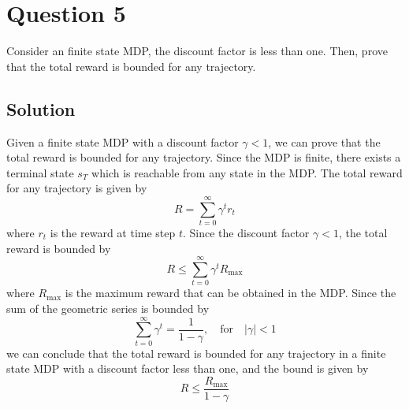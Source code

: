 \section*{Question 5}

Consider an finite state MDP, the discount factor is less than one.
Then, prove that the total reward is bounded for any trajectory.

\subsection*{Solution}

Given a finite state MDP with a discount factor \( \gamma < 1 \), we can prove that the total reward is bounded for any trajectory.
Since the MDP is finite, there exists a terminal state \( s_T \) which is reachable from any state in the MDP.\@
The total reward for any trajectory is given by
\[
    R = \sum_{t=0}^{\infty} \gamma^t r_t
\]
where \( r_t \) is the reward at time step \( t \).
Since the discount factor \( \gamma < 1 \), the total reward is bounded by
\[
    R \leq \sum_{t=0}^{\infty} \gamma^t R_{\text{max}}
\]
where \( R_{\text{max}} \) is the maximum reward that can be obtained in the MDP.\@
Since the sum of the geometric series is bounded by
\[
    \sum_{t=0}^{\infty} \gamma^t = \frac{1}{1 - \gamma}, \quad \text{for} \quad \vert \gamma \vert < 1
\]
we can conclude that the total reward is bounded for any trajectory in a finite state MDP with a discount factor less than one, and the bound is given by
\[
    R \leq \frac{R_{\text{max}}}{1 - \gamma}
\]
